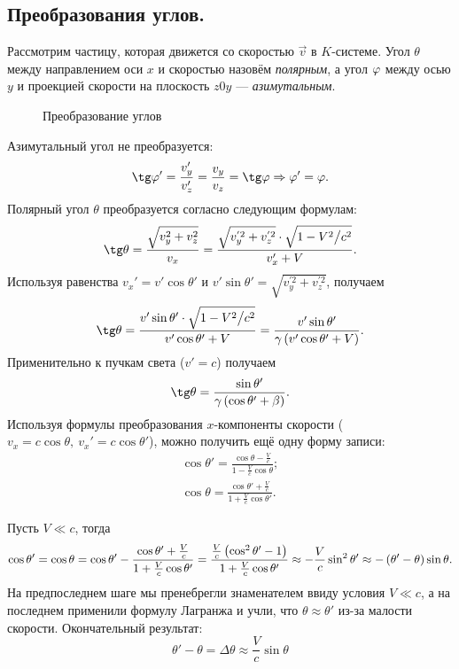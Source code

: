 \subsection{Преобразования углов.}
    Рассмотрим частицу, которая движется со скоростью $\vec{v}$ в $K$-системе. Угол $\theta$ между направлением оси $x$ и скоростью назовём
    \textit{полярным}, а угол $\varphi$ между осью $y$ и проекцией скорости на плоскость $z0y$ --- \textit{азимутальным}.

    \begin{figure}[h]
        \centering
        
        \caption{Преобразование углов}
    \end{figure}

    Азимутальный угол не преобразуется:
    \[
        \tg \phee ' = \frac{v_y'}{v_z'} = \frac{v_y}{v_z} = \tg \phee \Rightarrow \phee' = \phee.
    \]
    Полярный угол $\theta$ преобразуется согласно следующим формулам:
    \[
        \tg \theta = \frac{\sqrt{v_y^2 + v_z^2}}{v_x} = \frac{\sqrt{v_y^{'2} + v_z^{'2}} \cdot \Relroot}{v_x' + V}.
    \]
    Используя равенства $v_x' = v' \cos\theta'$ и $v' \sin \theta' = \sqrt{v_y^{'2} + v_z^{'2}}$, получаем
    \[
        \tg \theta = \frac{v' \sin \theta' \cdot \Relroot}{v' \cos \theta' + V} = \frac{v' \sin \theta'}{\gamma \brackets{v' \cos \theta' + V}}.
    \]
    Применительно к пучкам света ($v' = c$) получаем
    \[
        \tg \theta = \frac{\sin \theta'}{\gamma \brackets{\cos\theta' + \beta}}.
    \]
    Используя формулы преобразования $x$-компоненты скорости ($v_x = c \cos \theta, \ v_x' = c \cos \theta'$), можно получить ещё одну форму записи:
    \begin{gather*}
        \cos \theta' = \frac{\cos \theta - \frac{V}{c}}{1 - \frac{V}{c}\cos\theta}; \\
        \cos \theta = \frac{\cos \theta' + \frac{V}{c}}{1 + \frac{V}{c}\cos\theta'}.
    \end{gather*}

    Пусть $V \ll c$, тогда
    \[
        \cos \theta' = \cos \theta = \cos \theta' - \frac{\cos \theta' + \frac{V}{c}}{1 + \frac{V}{c} \cos \theta'} =
        \frac{\frac{V}{c} \left({\cos^2\theta' - 1}\right)}{1 + \frac{V}{c}\cos\theta'} \approx - \frac{V}{c} \sin^2\theta' \approx -\left({\theta' - \theta}\right) \sin \theta.
    \]
    На предпоследнем шаге мы пренебрегли знаменателем ввиду условия $V \ll c$, а на последнем применили формулу Лагранжа и учли, что $\theta \approx \theta'$ из-за малости скорости.
    Окончательный результат:
    \[
        \boxed{\theta' - \theta = \Delta \theta \approx \frac{V}{c} \sin \theta}
    \]

